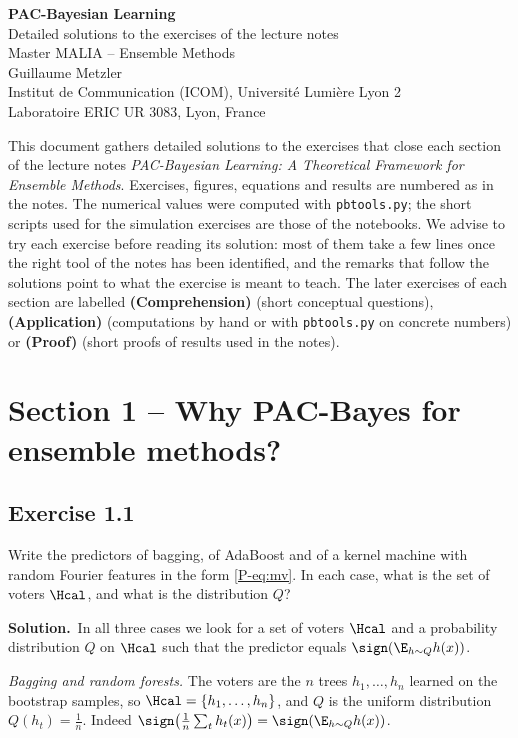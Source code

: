 \documentclass[11pt]{article}
\newcommand{\statement}[1]{\begin{tcolorbox}[enhanced,breakable,colback=black!3,colframe=black!25,boxrule=0.4pt,sharp corners,fontupper=\itshape\small]#1\end{tcolorbox}}
\newcommand{\exo}[1]{\Needspace{6\baselineskip}\subsection*{Exercise #1}\addcontentsline{toc}{subsection}{Exercise #1}}
\newcommand{\sol}{\noindent\textbf{Solution.}\ }
\begin{document}
\sloppy
\begin{center}
{\LARGE\bfseries PAC-Bayesian Learning}\\[0.2cm]
{\Large Detailed solutions to the exercises of the lecture notes}\\[0.3cm]
{\large Master MALIA -- Ensemble Methods}\\[0.4cm]
Guillaume Metzler\\
Institut de Communication (ICOM), Université Lumière Lyon 2\\
Laboratoire ERIC UR 3083, Lyon, France
\end{center}

\bigskip
\noindent This document gathers detailed solutions to the exercises that close each section of the lecture notes
\emph{PAC-Bayesian Learning: A Theoretical Framework for Ensemble Methods}. Exercises, figures, equations and results
are numbered as in the notes. The numerical values were computed with \texttt{pbtools.py}; the short scripts used
for the simulation exercises are those of the notebooks. We advise to try each exercise before reading its
solution: most of them take a few lines once the right tool of the notes has been identified, and the remarks
that follow the solutions point to what the exercise is meant to teach. The later exercises of each section are
labelled \textbf{(Comprehension)} (short conceptual questions), \textbf{(Application)} (computations by hand or with
\texttt{pbtools.py} on concrete numbers) or \textbf{(Proof)} (short proofs of results used in the notes).

\tableofcontents
\bigskip

\section*{Section 1 -- Why PAC-Bayes for ensemble methods?}

\exo{1.1}
\statement{Write the predictors of bagging, of AdaBoost and of a kernel machine with random Fourier features in the
form \eqref{P-eq:mv}. In each case, what is the set of voters $\Hcal$, and what is the distribution $Q$?}

\sol In all three cases we look for a set of voters $\Hcal$ and a probability distribution $Q$ on $\Hcal$ such that the
predictor equals $\sign(\E_{h\sim Q}h(x))$.

\emph{Bagging and random forests.} The voters are the $n$ trees $h_1,\dots,h_n$ learned on the bootstrap samples, so
$\Hcal=\{h_1,\dots,h_n\}$, and $Q$ is the uniform distribution $Q(h_t)=\frac1n$. Indeed
$\sign\big(\frac1n\sum_th_t(x)\big)=\sign(\E_{h\sim Q}h(x))$.
\end{document}
